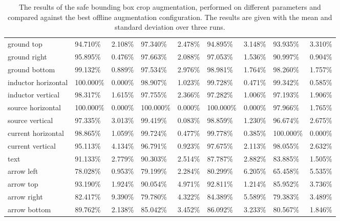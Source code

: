 \begin{table}[H]
\begin{center}
\begin{tabular}{|l|l|l|l|l|l|l|l|l|}
ground top                      & 94.710\%  & 2.108\% & 97.340\%  & 2.478\% & 94.895\%  & 3.148\%  & 93.935\%  & 3.310\%   \\
\rowcolor{lightgray!50}
ground right                    & 95.895\%  & 0.476\% & 97.663\%  & 2.088\% & 97.053\%  & 1.536\%  & 90.997\%  & 0.904\%   \\
ground bottom                   & 99.132\%  & 0.889\% & 97.534\%  & 2.976\% & 98.981\%  & 1.764\%  & 98.260\%  & 1.757\%   \\
\rowcolor{lightgray!50}
inductor horizontal             & 100.000\% & 0.000\% & 98.907\%  & 1.023\% & 99.728\%  & 0.471\%  & 99.342\%  & 0.585\%   \\
inductor vertical               & 98.317\%  & 1.615\% & 97.755\%  & 2.366\% & 97.282\%  & 1.006\%  & 97.193\%  & 1.906\%   \\
\rowcolor{lightgray!50}
source horizontal               & 100.000\% & 0.000\% & 100.000\% & 0.000\% & 100.000\% & 0.000\%  & 97.966\%  & 1.765\%   \\
source vertical                 & 97.335\%  & 3.013\% & 99.419\%  & 0.083\% & 98.859\%  & 1.230\%  & 96.674\%  & 2.675\%   \\
\rowcolor{lightgray!50}
current horizontal              & 98.865\%  & 1.059\% & 99.724\%  & 0.477\% & 99.778\%  & 0.385\%  & 100.000\% & 0.000\%   \\
current vertical                & 95.113\%  & 4.134\% & 96.791\%  & 0.923\% & 97.675\%  & 2.113\%  & 98.055\%  & 2.632\%   \\
\rowcolor{lightgray!50}
text                            & 91.133\%  & 2.779\% & 90.303\%  & 2.514\% & 87.787\%  & 2.882\%  & 83.885\%  & 1.505\%   \\
arrow left                      & 78.028\%  & 0.953\% & 79.199\%  & 2.284\% & 80.299\%  & 6.205\%  & 65.458\%  & 5.535\%   \\
\rowcolor{lightgray!50}
arrow top                       & 93.190\%  & 1.924\% & 90.054\%  & 4.971\% & 92.811\%  & 1.214\%  & 85.952\%  & 3.736\%   \\
arrow right                     & 82.417\%  & 9.390\% & 79.780\%  & 4.322\% & 84.389\%  & 5.589\%  & 79.383\%  & 3.489\%   \\
\rowcolor{lightgray!50}
arrow bottom                    & 89.762\%  & 2.138\% & 85.042\%  & 3.452\% & 86.092\%  & 3.233\%  & 80.567\%  & 1.846\%   \\
\hline

\end{tabular}
\caption{The results of the safe bounding box crop augmentation, performed on different parameters and compared against the best offline augmentation configuration. The results are given with the mean and standard deviation over three runs.}
\label{tab:yolo_bbox_safe_crop_augmentation_result}
\end{center}
\end{table}

